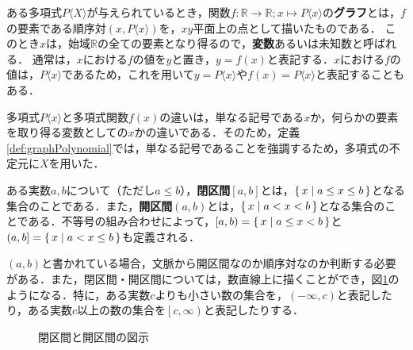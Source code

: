 \begin{definition}[多項式関数のグラフ]
	\label{def:graphPolynomial}%
	ある多項式$P\langle X\rangle$が与えられているとき，関数$f : \mathbb{R} \rightarrow \mathbb{R}; x \mapsto P\langle x\rangle$の\textbf{グラフ}とは，$f$の要素である順序対$(x, P\langle x\rangle)$を，$xy$平面上の点として描いたものである．
	このとき$x$は，始域$\mathbb{R}$の全ての要素となり得るので，\textbf{変数}あるいは未知数と呼ばれる．
	通常は，$x$における$f$の値を$y$と置き，$y = f(x)$と表記する．$x$における$f$の値は，$P\langle x\rangle$であるため，これを用いて$y = P\langle x\rangle$や$f(x) = P\langle x\rangle$と表記することもある．
\end{definition}
\begin{rem*}
	多項式$P\langle x\rangle$と多項式関数$f(x)$の違いは，単なる記号である$x$か，何らかの要素を取り得る変数としての$x$かの違いである．そのため，定義\ref{def:graphPolynomial}では，単なる記号であることを強調するため，多項式の不定元に$X$を用いた．
\end{rem*}
\begin{definition}
	ある実数$a, b$について（ただし$a \leq b$），\textbf{閉区間}$\left[a, b\right]$とは，$\left\{\,x \mid a \leq x \leq b\,\right\}$となる集合のことである．また，\textbf{開区間}$\left(a, b\right)$とは，$\left\{\,x \mid a < x < b\,\right\}$となる集合のことである．不等号の組み合わせによって，$\left[a, b\right) = \left\{\,x \mid a \leq x < b\,\right\}$と$\left(a, b\right] = \left\{\,x \mid a < x \leq b\,\right\}$も定義される．
\end{definition}
\begin{rem*}
	$\left(a, b\right)$と書かれている場合，文脈から開区間なのか順序対なのか判断する必要がある．また，閉区間・開区間については，数直線上に描くことができ，図\ref{fig:interval}のようになる．特に，ある実数$c$よりも小さい数の集合を，$\left(-\infty, c\right)$と表記したり，ある実数$c$以上の数の集合を$\left[c, \infty\right)$と表記したりする．
	
	\vfill
	\begin{figure}[!h]
		\caption{閉区間と開区間の図示}
		\label{fig:interval}
	\end{figure}
\end{rem*}
\clearpage

